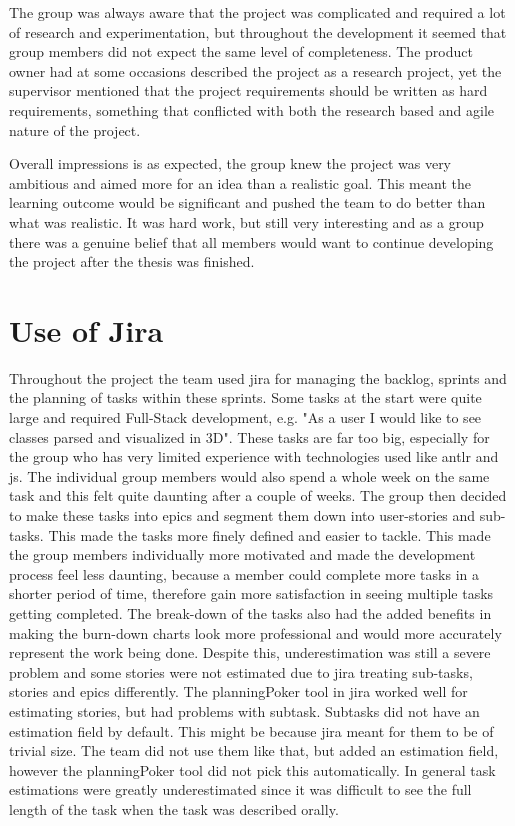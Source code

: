 The group was always aware that the project was complicated and required a lot of research and experimentation, but throughout the development it seemed that group members did not expect the same level of completeness. The product owner had at some occasions described the project as a research project, yet the supervisor mentioned that the project requirements should be written as hard requirements, something that conflicted with both the research based and agile nature of the project.

Overall impressions is as expected, the group knew the project was very ambitious and aimed more for an idea than a realistic goal. This meant the learning outcome would be significant and pushed the team to do better than what was realistic. It was hard work, but still very interesting and as a group there was a genuine belief that all members would want to continue developing the project after the thesis was finished.

\section{Use of Jira}
Throughout the project the team used \gls{jira} for managing the backlog, sprints and the planning of tasks within these sprints. Some tasks at the start were quite large and required Full-Stack development, e.g. "As a user I would like to see classes parsed and visualized in 3D". These tasks are far too big, especially for the group who has very limited experience with technologies used like \gls{antlr} and \gls{js}. The individual group members would also spend a whole week on the same task and this felt quite daunting after a couple of weeks. The group then decided to make these tasks into epics and segment them down into user-stories and sub-tasks. This made the tasks more finely defined and easier to tackle. This made the group members individually more motivated and made the development process feel less daunting, because a member could complete more tasks in a shorter period of time, therefore gain more satisfaction in seeing multiple tasks getting completed. The break-down of the tasks also had the added benefits in making the burn-down charts look more professional and would more accurately represent the work being done. Despite this, underestimation was still a severe problem and some stories were not estimated due to \gls{jira} treating sub-tasks, stories and epics differently. The \gls{planningPoker} tool in \gls{jira} worked well for estimating stories, but had problems with subtask. Subtasks did not have an estimation field by default. This might be because \gls{jira} meant for them to be of trivial size. The team did not use them like that, but added an estimation field, however the \gls{planningPoker} tool did not pick this automatically. In general task estimations were greatly underestimated since it was difficult to see the full length of the task when the task was described orally.


